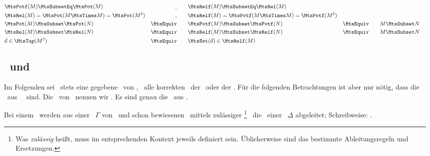\begin{align}
	& \MtsPotf(M) \MtsSubsetEq \MtsPot          (M)
	& ,          \qquad
	& \MtsRelf(M) \MtsSubsetEq \MtsRel          (M)
	\label{eq:Setf} \\
	& \MtsRel (M) =            \MtsPot (M \MtsTimes M)=\MtsPot (M^2)
	& ,          \qquad
	& \MtsRelf(M) =            \MtsPotf(M \MtsTimes M)=\MtsPotf(M^2)
	\label{eq:relPot} \\
	& \MtsPot (M) \MtsSubset   \MtsPot          (N)
	& \MtsEquiv \qquad
	& \MtsPotf(M) \MtsSubset   \MtsPotf         (N)
	& \MtsEquiv \qquad
	&               M  \MtsSubset                          N
	\label{eq:potPot} \\
	& \MtsRel (M) \MtsSubset   \MtsRel          (N)
	& \MtsEquiv \qquad
	& \MtsRelf(M) \MtsSubset   \MtsRelf         (N)
	& \MtsEquiv \qquad
	&               M  \MtsSubset                          N
	\label{eq:relRel} \\
	&                                 \vec{a}  \in \MtsTup(M^2)
	& \MtsEquiv \qquad  & \MtsSet(\vec{a}) \in \MtsRelf    (M)
	\label{eq:vecrel}
\end{align}

\subsection[Formeln und Ableitungen]{\Formeln\ und \Ableitungen}%
\label             {sub:Ableitungen}

Im Folgenden sei \MtsSprache\ stets eine gegebene \Menge\ von \Formeln, \textzB\ alle korrekten \Formeln\ der \Aussagenlogik\ oder der \Praedikatenlogik.
Für die folgenden Betrachtungen ist aber nur nötig, dass die \Elemente\ aus \MtsSprache\ \Symbolketten\ sind.
Die \Teilmengen\ von \MtsSprache\ nennen wir .
Es sind genau die \Elemente\ aus \MtsPotSprache.

Bei einem \Beweis\ werden aus einer \Formelmenge\ $\Gamma$ von \Axiomen\ und schon bewiesenen \Formeln\ mittels zulässiger
\footnote{%
	Was \emph{zulässig} heißt, muss im entsprechenden Kontext jeweils definiert sein.
	Üblicherweise sind das bestimmte Ableitungsregeln und Ersetzungen.
}
\Ableitungen\ die \Formeln\ einer \Formelmenge\ $\Delta$ abgeleitet; Schreibweise: \seqqt{$\Gamma \MtsDerive \Delta$}.

